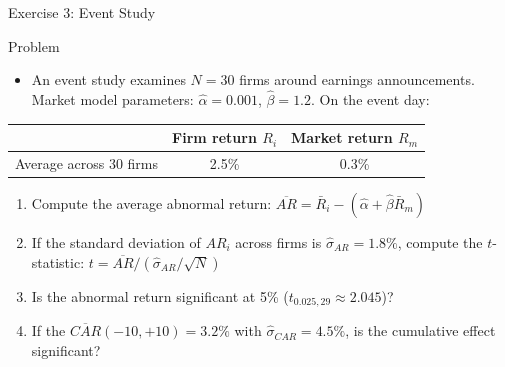 \documentclass[9pt, aspectratio=169, t]{beamer}
\theoremstyle{definition}
\newenvironment{cminipage}[1]{%
    \par\noindent\hfill\begin{minipage}{#1}\ignorespaces
}{%
    \end{minipage}\hfill\null\par
}
\begin{document}
\begin{frame}{Exercise 3: Event Study}
\begin{cminipage}{0.95\textwidth}
\begin{block}{Problem}
\begin{itemize}
\item An event study examines $N = 30$ firms around earnings announcements. Market model parameters: $\hat{\alpha} = 0.001$, $\hat{\beta} = 1.2$. On the event day:
\end{itemize}
\begin{center}
{\small
\renewcommand{\arraystretch}{1.2}
\begin{tabular}{lcc}
\toprule
& \textbf{Firm return $R_i$} & \textbf{Market return $R_m$} \\
\midrule
Average across 30 firms & 2.5\% & 0.3\% \\
\bottomrule
\end{tabular}
}
\end{center}
\end{block}
\begin{enumerate}
    \item Compute the average abnormal return: $\overline{AR} = \bar{R}_i - (\hat{\alpha} + \hat{\beta}\bar{R}_m)$
    \item If the standard deviation of $AR_i$ across firms is $\hat{\sigma}_{AR} = 1.8\%$, compute the $t$-statistic: $t = \overline{AR} / (\hat{\sigma}_{AR}/\sqrt{N})$
    \item Is the abnormal return significant at 5\% ($t_{0.025, 29} \approx 2.045$)?
    \item If the $\overline{CAR}(-10, +10) = 3.2\%$ with $\hat{\sigma}_{CAR} = 4.5\%$, is the cumulative effect significant?
\end{enumerate}
\end{cminipage}
\end{frame}
\end{document}
